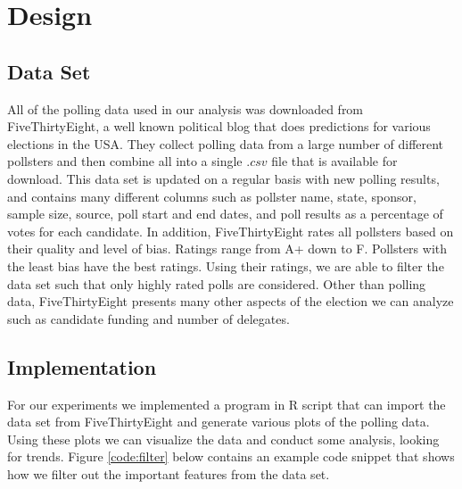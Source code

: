 \section{Design}\label{design}

\subsection{Data Set}

All of the polling data used in our analysis was downloaded from FiveThirtyEight, a well known political blog that does predictions for various elections in the USA\cite{jr._malone_skelley_koerth_paine_dubin_sawchik_rakich}. They collect polling data from a large number of different pollsters and then combine all into a single $.csv$ file that is available for download. This data set is updated on a regular basis with new polling results, and contains many different columns such as pollster name, state, sponsor, sample size, source, poll start and end dates, and poll results as a percentage of votes for each candidate. In addition, FiveThirtyEight rates all pollsters based on their quality and level of bias. Ratings range from A+ down to F. Pollsters with the least bias have the best ratings. Using their ratings, we are able to filter the data set such that only highly rated polls are considered. Other than polling data, FiveThirtyEight presents many other aspects of the election we can analyze such as candidate funding and number of delegates.

\subsection{Implementation}

For our experiments we implemented a program in R script that can import the data set from FiveThirtyEight and generate various plots of the polling data. Using these plots we can visualize the data and conduct some analysis, looking for trends. Figure \ref{code:filter} below contains an example code snippet that shows how we filter out the important features from the data set.

